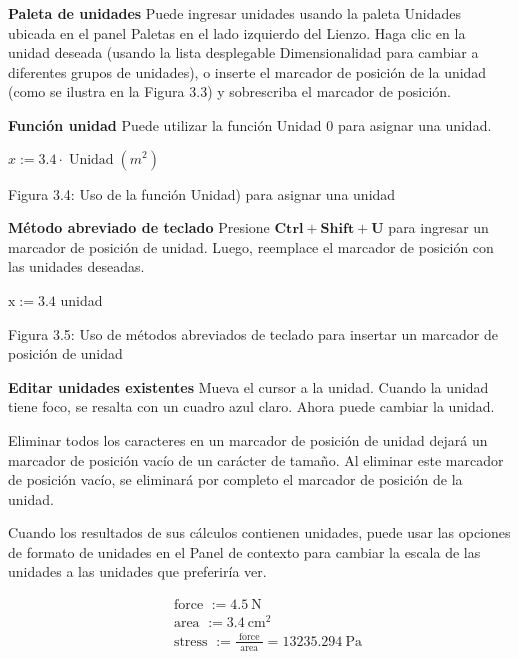 \textbf{Paleta de unidades}
Puede ingresar unidades usando la paleta Unidades ubicada en el panel Paletas en el lado izquierdo del Lienzo. Haga clic en la unidad deseada (usando la lista desplegable Dimensionalidad para cambiar a diferentes grupos de unidades), o inserte el marcador de posición de la unidad (como se ilustra en la Figura 3.3) y sobrescriba el marcador de posición.






\textbf{Función unidad}
Puede utilizar la función Unidad 0 para asignar una unidad.

$x:=3.4 \cdot \operatorname{Unidad}\left(m^{2}\right)$

Figura 3.4: Uso de la función Unidad) para asignar una unidad

\textbf{Método abreviado de teclado}
Presione $\mathbf{C t r l}+\mathbf{S h i f t}+\mathbf{U}$ para ingresar un marcador de posición de unidad. Luego, reemplace el marcador de posición con las unidades deseadas.

$\mathrm{x}:=3.4$ unidad

Figura 3.5: Uso de métodos abreviados de teclado para insertar un marcador de posición de unidad

\textbf{Editar unidades existentes}
Mueva el cursor a la unidad. Cuando la unidad tiene foco, se resalta con un cuadro azul claro. Ahora puede cambiar la unidad.

Eliminar todos los caracteres en un marcador de posición de unidad dejará un marcador de posición vacío de un carácter de tamaño. Al eliminar este marcador de posición vacío, se eliminará por completo el marcador de posición de la unidad.

Cuando los resultados de sus cálculos contienen unidades, puede usar las opciones de formato de unidades en el Panel de contexto para cambiar la escala de las unidades a las unidades que preferiría ver.

\begin{equation*}
\begin{aligned}
& \text { force }:=4.5 \mathrm{~N} \\
& \text { area }:=3.4 \mathrm{~cm}^{2} \\
& \text { stress }:=\frac{\text { force }}{\text { area }}=13235.294 \mathrm{~Pa}
\end{aligned}
\end{equation*}

